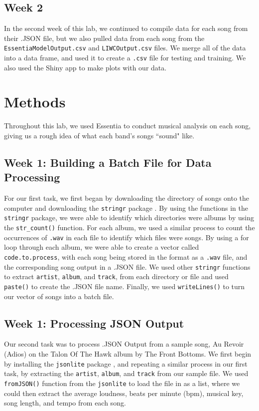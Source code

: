 \documentclass{article}\usepackage[]{graphicx}\usepackage[]{xcolor}
\begin{document}
\begin{multicols}{2}
\subsection{Week 2}
In the second week of this lab, we continued to compile data for each song from their .JSON file, but we also pulled data from each song from the \texttt{EssentiaModelOutput.csv} and \texttt{LIWCOutput.csv} files. We merge all of the data into a data frame, and used it to create a \texttt{.csv} file for testing and training. We also used the Shiny app to make plots with our data. 
\columnbreak

\section{Methods}
\indent Throughout this lab, we used Essentia \citep{essentia} to conduct musical analysis on each song, giving us a rough idea of what each band's songs ``sound" like.

\subsection{Week 1: Building a Batch File for Data Processing}
\indent For our first task, we first began by downloading the directory of songs onto the computer and downloading the \texttt{stringr} package \citep{stringr}. By using the functions in the \texttt{stringr} package, we were able to identify which directories were albums by using the \verb|str_count()| function. For each album, we used a similar process to count the occurrences of \texttt{.wav} in each file to identify which files were songs. By using a for loop through each album, we were able to create a vector called \texttt{code.to.process}, with each song being stored in the format as a \texttt{.wav} file, and the corresponding song output in a .JSON file.
We used other \texttt{stringr} functions to extract \texttt{artist}, \texttt{album}, and \texttt{track}, from each directory or file and used \verb|paste()| to create the .JSON file name.
Finally, we used \verb|writeLines()| to turn our vector of songs into a batch file. 
\subsection{Week 1: Processing JSON Output}
\indent Our second task was to process .JSON Output from a sample song, Au Revoir (Adios) on the Talon Of The Hawk album by The Front Bottoms. We first begin by installing the \texttt{jsonlite} package \citep{jsonlite}, and repeating a similar process in our first task, by extracting the \texttt{artist}, \texttt{album}, and \texttt{track} from our sample file. We used \verb|fromJSON()| function from the \texttt{jsonlite} to load the file in as a list, where we could then extract the average loudness, beats per minute (bpm), musical key, song length, and tempo from each song. 


\end{multicols}
\end{document}
